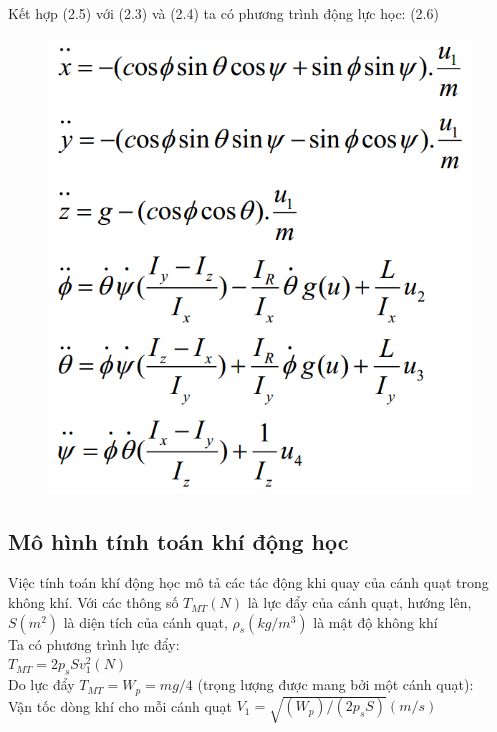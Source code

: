        \\
        Kết hợp (2.5) với (2.3) và (2.4) ta có phương trình động lực học: (2.6)
        \begin{figure}[h!]
	        	\begin{center}
	        		\includegraphics[scale=0.5]{images/Cuong-6.png}
	        	\end{center}
        \end{figure} 
        
        \subsection{Mô hình tính toán khí động học}
        Việc tính toán khí động học mô tả các tác động khi quay của cánh quạt trong không khí. Với các thông số $T_{MT}(N)$ là lực đẩy của cánh quạt, hướng lên, $S(m^2)$ là diện tích của cánh quạt, $\rho_{s}(kg/m^3)$ là mật độ không khí
        \\
        Ta có phương trình lực đẩy:
        \\
        $T_{MT} = 2p_sSv_1^2(N)$
        \\
        Do lực đẩy $T_{MT} = W_p = mg/4$ (trọng lượng được mang bởi một cánh quạt):
        \\
        Vận tốc dòng khí cho mỗi cánh quạt $V_1 = \sqrt{(W_p)/(2p_sS)} (m/s) $
